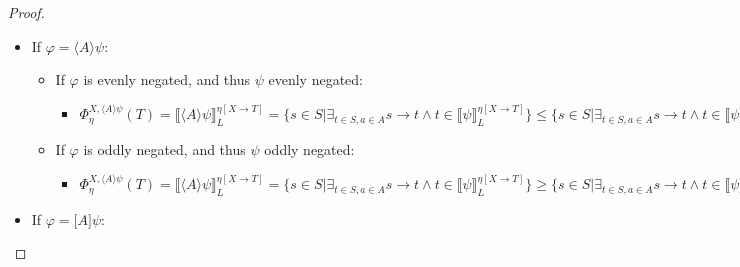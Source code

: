 \documentclass[11pt]{article}
\theoremstyle{definition}
\theoremstyle{plain}
\let\temp\phi
\let\phi\varphi
\let\varphi\temp
\begin{document}
\begin{appendices}
\begin{proof}
\begin{itemize}
\begin{itemize}
\begin{itemize}
\end{itemize}
\item If $ \phi $ is oddly negated, and thus $ \varphi $ and $ \psi $ oddly negated:
\begin{itemize}
\item $ \Phi_{\eta}^{X,\varphi \vee \psi}(T) = \llbracket \varphi \vee \psi \rrbracket_L^{\eta[X\rightarrow T]} = \llbracket \varphi \rrbracket_L^{\eta[X\rightarrow T]} \cap \llbracket \psi \rrbracket_L^{\eta[X\rightarrow T]} \geq \llbracket \varphi \rrbracket_L^{\eta[X\rightarrow R]} \cap \llbracket \psi \rrbracket_L^{\eta[X\rightarrow R]} = \llbracket \varphi \vee \psi \rrbracket_L^{\eta[X\rightarrow R]} = \Phi_{\eta}^{X,\varphi \vee \psi}(R)$
\end{itemize}
\end{itemize}
\item If $ \phi = \langle A \rangle \psi $:
\begin{itemize}
\item If $ \phi $ is evenly negated, and thus $ \psi $ evenly negated:
\begin{itemize}
\item $ \Phi_{\eta}^{X,\langle A \rangle \psi}(T) = \llbracket \langle A \rangle \psi \rrbracket_L^{\eta[X\rightarrow T]} = \{s\in S \vert \exists_{t\in S,a\in A} s\rightarrow t \wedge t \in \llbracket \psi \rrbracket_L^{\eta[X\rightarrow T]}\} \leq \{s\in S \vert \exists_{t\in S,a\in A} s\rightarrow t \wedge t \in \llbracket \psi \rrbracket_L^{\eta[X\rightarrow R]}\} = \llbracket \langle A \rangle \psi \rrbracket_L^{\eta[X\rightarrow R]} = \Phi_{\eta}^{X,\langle A \rangle \psi}(R)$
\end{itemize}
\item If $ \phi $ is oddly negated, and thus $ \psi $ oddly negated:
\begin{itemize}
\item $ \Phi_{\eta}^{X,\langle A \rangle \psi}(T) = \llbracket \langle A \rangle \psi \rrbracket_L^{\eta[X\rightarrow T]} = \{s\in S \vert \exists_{t\in S,a\in A} s\rightarrow t \wedge t \in \llbracket \psi \rrbracket_L^{\eta[X\rightarrow T]}\} \geq \{s\in S \vert \exists_{t\in S,a\in A} s\rightarrow t \wedge t \in \llbracket \psi \rrbracket_L^{\eta[X\rightarrow R]}\} = \llbracket \langle A \rangle \psi \rrbracket_L^{\eta[X\rightarrow R]} = \Phi_{\eta}^{X,\langle A \rangle \psi}(R)$
\end{itemize}
\end{itemize}
\item If $ \phi = \lbrack A \rbrack \psi $:

\end{itemize}
\end{proof}
\end{appendices}
\end{document}
